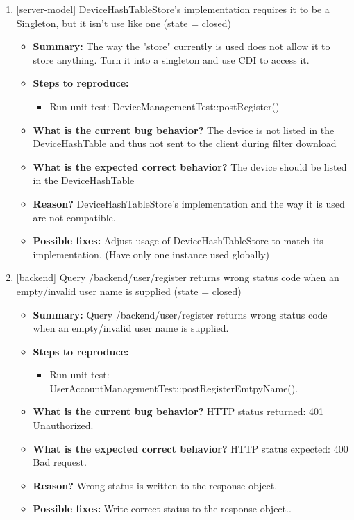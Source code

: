 \begin{enumerate}
\item {[server-model] DeviceHashTableStore's implementation requires it to be a Singleton, but it isn't use like one (state = closed)}
\begin{itemize}	
	\item \textbf{Summary: }The way the "store" currently is used does not allow it to store anything. Turn it into a singleton and use CDI to access it.\\
	\item \textbf{Steps to reproduce: }
	\begin{itemize}
		\item Run unit test: DeviceManagementTest::postRegister()\\
	\end{itemize}
	\item \textbf{What is the current bug behavior? } The device is not listed in the DeviceHashTable and thus not sent to the client during filter download\\
	\item \textbf{What is the expected correct behavior? } The device should be listed in the DeviceHashTable\\
	\item \textbf{Reason? } DeviceHashTableStore's implementation and the way it is used are not compatible.\\
	\item \textbf{Possible fixes: } Adjust usage of DeviceHashTableStore to match its implementation. (Have only one instance used globally)\\
\end{itemize}


\item {[backend] Query /backend/user/register returns wrong status code when an empty/invalid user name is supplied (state = closed)}
\begin{itemize}	
	\item \textbf{Summary: }Query /backend/user/register returns wrong status code when an empty/invalid user name is supplied.\\
	\item \textbf{Steps to reproduce: }
	\begin{itemize}
		\item Run unit test: UserAccountManagementTest::postRegisterEmtpyName().\\
	\end{itemize}
	\item \textbf{What is the current bug behavior? }HTTP status returned: 401 Unauthorized.\\
	\item \textbf{What is the expected correct behavior? }HTTP status expected: 400 Bad request.\\
	\item \textbf{Reason? } Wrong status is written to the response object.\\
	\item \textbf{Possible fixes: }Write correct status to the response object..\\
\end{itemize}



\end{enumerate}
